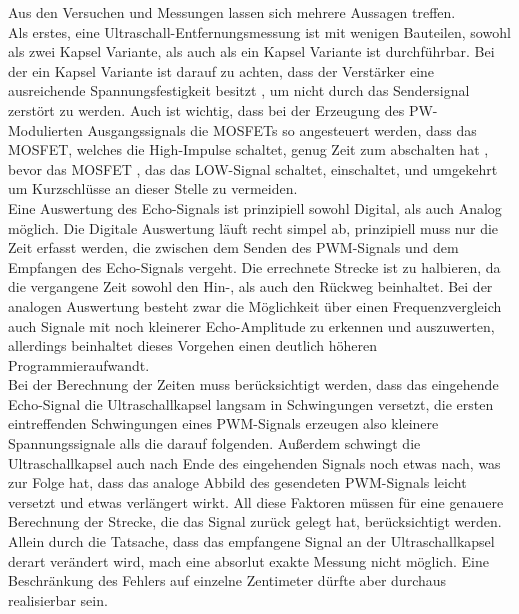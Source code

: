 Aus den Versuchen und Messungen lassen sich mehrere Aussagen treffen. \\
Als erstes, eine Ultraschall-Entfernungsmessung ist mit wenigen Bauteilen, sowohl als zwei Kapsel Variante, als auch als ein Kapsel Variante ist durchführbar. Bei der ein Kapsel Variante ist darauf zu achten, dass der Verstärker eine ausreichende Spannungsfestigkeit besitzt , um nicht durch das Sendersignal zerstört zu werden. Auch ist wichtig, dass bei der Erzeugung des PW-Modulierten Ausgangssignals die MOSFETs so angesteuert werden, dass das MOSFET, welches die High-Impulse schaltet, genug Zeit zum abschalten hat , bevor das MOSFET , das das LOW-Signal schaltet, einschaltet, und umgekehrt um Kurzschlüsse an dieser Stelle zu vermeiden.\\
Eine Auswertung des Echo-Signals ist prinzipiell sowohl Digital, als auch Analog möglich. Die Digitale Auswertung läuft recht simpel ab, prinzipiell muss nur die Zeit erfasst werden, die zwischen dem Senden des PWM-Signals und dem Empfangen des Echo-Signals vergeht. Die errechnete Strecke ist zu halbieren, da die vergangene Zeit sowohl den Hin-, als auch den Rückweg beinhaltet. Bei der analogen Auswertung besteht zwar die Möglichkeit über einen Frequenzvergleich auch Signale mit noch kleinerer Echo-Amplitude zu erkennen und auszuwerten, allerdings beinhaltet dieses Vorgehen einen deutlich höheren Programmieraufwandt.\\
Bei der Berechnung der Zeiten muss berücksichtigt werden, dass das eingehende Echo-Signal die Ultraschallkapsel langsam in Schwingungen versetzt, die ersten eintreffenden Schwingungen eines PWM-Signals erzeugen also kleinere Spannungssignale alls die darauf folgenden. Außerdem schwingt die Ultraschallkapsel auch nach Ende des eingehenden Signals noch etwas nach, was zur Folge hat, dass das analoge Abbild des gesendeten PWM-Signals leicht versetzt und etwas verlängert wirkt. All diese Faktoren müssen für eine genauere Berechnung der Strecke, die das Signal zurück gelegt hat, berücksichtigt werden. Allein durch die Tatsache, dass das empfangene Signal an der Ultraschallkapsel derart verändert wird, mach eine absorlut exakte Messung nicht möglich. Eine Beschränkung des Fehlers auf einzelne Zentimeter dürfte aber durchaus realisierbar sein.